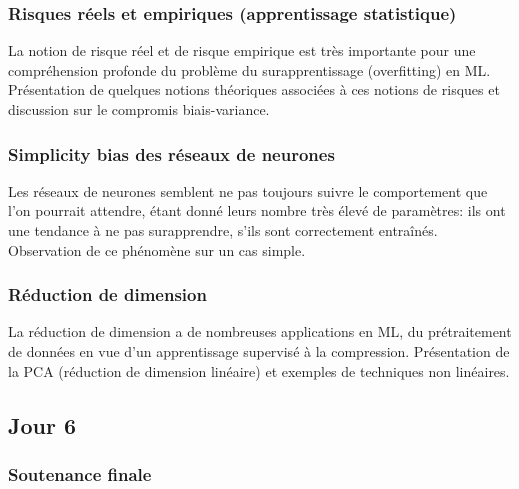 \documentclass[
10pt, %
a4paper, %
oneside, %
headinclude,footinclude, %
BCOR5mm, %
]{scrartcl}
\begin{document}
\subsubsection{Risques réels et empiriques (apprentissage statistique)}%
\label{ssub:}

La notion de risque réel et de risque empirique est très importante pour une compréhension profonde du problème du surapprentissage (overfitting) en ML. Présentation de quelques notions théoriques associées à ces notions de risques et discussion sur le compromis biais-variance.

\subsubsection{Simplicity bias des réseaux de neurones}%
\label{ssub:}

Les réseaux de neurones semblent ne pas toujours suivre le comportement que l'on pourrait attendre, étant donné leurs nombre très élevé de paramètres: ils ont une tendance à ne pas surapprendre, s'ils sont correctement entraînés. Observation de ce phénomène sur un cas simple.

\subsubsection{Réduction de dimension}%
\label{ssub:}

La réduction de dimension a de nombreuses applications en ML, du prétraitement de données en vue d'un apprentissage supervisé à la compression. Présentation de la PCA (réduction de dimension linéaire) et exemples de techniques non linéaires.

\subsection{\large{Jour 6}}%
\label{sec:Jour 6}


\subsubsection{Soutenance finale}%
\label{ssub:soutenance_finale}
\end{document}
